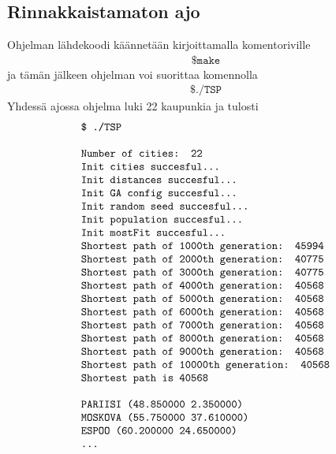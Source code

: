 \documentclass[12pt]{article}
\numberwithin{equation}{section}
\numberwithin{table}{section}
\begin{document}
\subsection{Rinnakkaistamaton ajo}
Ohjelman lähdekoodi käännetään kirjoittamalla komentoriville  
\begin{align*}
\texttt{\$ make}
\end{align*}
ja tämän jälkeen ohjelman voi suorittaa  komennolla
\begin{align*}
\texttt{\$ ./TSP}
\end{align*}
Yhdessä ajossa ohjelma luki 22 kaupunkia ja tulosti
\begin{align*}
\begin{tabular}{l}
\texttt{\$ ./TSP }\\
\\
\texttt{Number of cities: 22}\\
\texttt{Init cities succesful... }\\
\texttt{Init distances succesful... }\\
\texttt{Init GA config succesful... }\\
\texttt{Init random seed succesful... }\\
\texttt{Init population succesful... }\\
\texttt{Init mostFit succesful... }\\
\texttt{Shortest path of 1000th generation: 45994}\\
\texttt{Shortest path of 2000th generation: 40775}\\
\texttt{Shortest path of 3000th generation: 40775}\\
\texttt{Shortest path of 4000th generation: 40568}\\
\texttt{Shortest path of 5000th generation: 40568}\\
\texttt{Shortest path of 6000th generation: 40568}\\
\texttt{Shortest path of 7000th generation: 40568}\\
\texttt{Shortest path of 8000th generation: 40568}\\
\texttt{Shortest path of 9000th generation: 40568}\\
\texttt{Shortest path of 10000th generation: 40568}\\
\texttt{Shortest path is 40568}\\
\\
\texttt{PARIISI (48.850000 2.350000)}\\
\texttt{MOSKOVA (55.750000 37.610000)}\\
\texttt{ESPOO (60.200000 24.650000)}\\
\texttt{...}
\end{tabular}
\end{align*}
\end{document}
